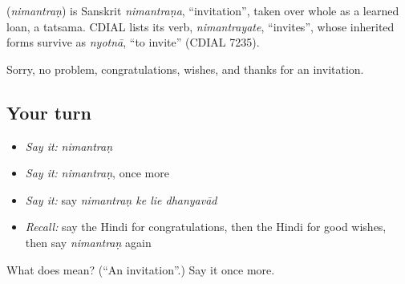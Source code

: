\begin{cousinweb}
\textbf{} (\emph{nimantraṇ}) is Sanskrit \emph{nimantraṇa}, \textquotedblleft{}invitation\textquotedblright{}, taken over whole as a learned loan, a tatsama. CDIAL lists its verb, \emph{nimantrayate}, \textquotedblleft{}invites\textquotedblright{}, whose inherited forms survive as \emph{nyotnā}, \textquotedblleft{}to invite\textquotedblright{} (CDIAL 7235).
\end{cousinweb}

\begin{grammarlens}[title={What you've built}]
Sorry, no problem, congratulations, wishes, and thanks for an invitation.
\end{grammarlens}

\subsection*{Your turn}
\begin{itemize}
\raggedright
  \item \emph{Say it:} \emph{nimantraṇ}
  \item \emph{Say it:} \emph{nimantraṇ}, once more
  \item \emph{Say it:} say \emph{nimantraṇ ke lie dhanyavād}
  \item \emph{Recall:} say the Hindi for congratulations, then the Hindi for good wishes, then say \emph{nimantraṇ} again
\end{itemize}

\begin{tcolorbox}[breakable,colback=teal!4,colframe=teal!35!black,title={Before you move on}]
What does  mean? (\textquotedblleft{}An invitation\textquotedblright{}.) Say it once more.
\end{tcolorbox}
